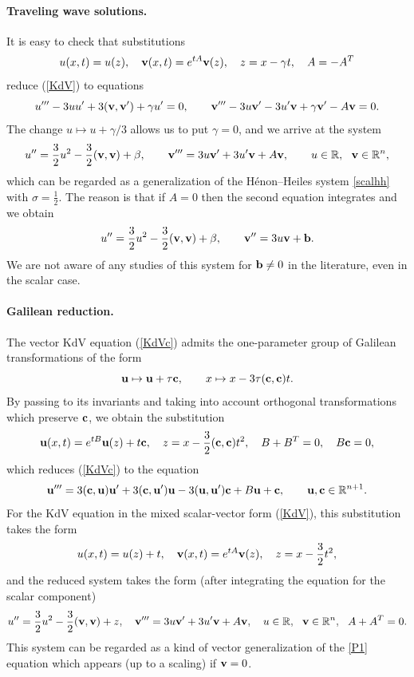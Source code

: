 \documentclass[11pt]{article}
\theoremstyle{plain}
\theoremstyle{definition}
\begin{document}
\paragraph{Traveling wave solutions.} It is easy to check that substitutions
\[
 u(x,t)= u(z),\quad {\bf v}(x,t)=e^{tA}{\bf v}(z),\quad z=x-\gamma t,\quad A=-A^T
\]
reduce (\ref{KdV}) to equations
\[
 u'''-3 u u'+3({\bf v},{\bf v}')+\gamma u'=0,\qquad 
 {\bf v}'''-3u{\bf v}'-3u'{\bf v}+\gamma {\bf v}'-A{\bf v}=0.
\]
The change $u\mapsto u+\gamma/3$ allows us to put $\gamma=0$, and we arrive at the system
\begin{equation}\label{KdV-wave}
 u''=\frac{3}{2}u^2-\frac{3}{2}({\bf v},{\bf v})+\beta,\qquad 
 {\bf v}'''=3u{\bf v}'+3u'{\bf v}+A{\bf v}, \qquad u\in{\mathbb R},~~{\bf v}\in{\mathbb R}^n,
\end{equation}
which can be regarded as a generalization of the H\'enon–Heiles system \eqref{scalhh} with $\sigma=\frac{1}{2}$. The reason is that if $A=0$ then the second equation integrates and we obtain
\begin{equation}\label{zeroA}
 u''=\frac{3}{2}u^2-\frac{3}{2}({\bf v},{\bf v})+\beta,\qquad 
 {\bf v}''=3u{\bf v} +{\bf b}.
\end{equation}
We are not aware of any studies of this system for ${\bf b}\ne 0$ in the literature, even in the scalar case.

\paragraph{Galilean reduction.} The vector KdV equation (\ref{KdVc}) admits the one-parameter group of Galilean transformations of the form 
\[
 {\bf u}\mapsto {\bf u}+\tau {\bf c},\qquad x\mapsto x-3\tau({\bf c},{\bf c})t.
\]
By passing to its invariants and taking into account orthogonal transformations which preserve ${\bf c}$, we obtain the substitution
\[
 {\bf u}(x,t)=e^{tB}{\bf u}(z)+t{\bf c},\quad z=x-\frac{3}{2}({\bf c},{\bf c})t^2,\quad B+B^T=0,\quad B{\bf c}=0,
\]
which reduces (\ref{KdVc}) to the equation
\begin{equation}\label{KdVc-Gal}
 {\bf u}'''=3({\bf c},{\bf u}){\bf u}'+3({\bf c},{\bf u}'){\bf u}-3({\bf u},{\bf u}'){\bf c}+B{\bf u}+{\bf c},\qquad 
 {\bf u},{\bf c}\in{\mathbb R}^{n+1}. 
\end{equation}
For the KdV equation in the mixed scalar-vector form (\ref{KdV}), this substitution takes the form
\[
 u(x,t)=u(z)+t,\quad {\bf v}(x,t)=e^{tA}{\bf v}(z),\quad z=x-\frac{3}{2}t^2,
\]
and the reduced system takes the form (after integrating the equation for the scalar component)
\begin{equation}\label{KdV-Gal}
 u''=\frac{3}{2}u^2-\frac{3}{2}({\bf v},{\bf v})+z,\quad 
 {\bf v}'''=3u{\bf v}'+3u'{\bf v}+A{\bf v},\quad 
 u\in{\mathbb R},~~ {\bf v}\in{\mathbb R}^n,~~ A+A^T=0.
\end{equation}
This system can be regarded as a kind of vector generalization of the \ref{P1} equation which appears (up to a scaling) if ${\bf v}=0$.
\end{document}
